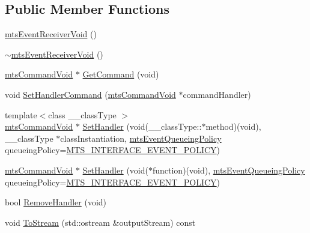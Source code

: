 \subsection*{Public Member Functions}
\begin{DoxyCompactItemize}
\item 
\hyperlink{classmts_event_receiver_void_a211c3ee9432981545d688bf092554813}{mts\+Event\+Receiver\+Void} ()
\item 
\hyperlink{classmts_event_receiver_void_a7c910721b7b8ae3a6b20ba2942da84b8}{$\sim$mts\+Event\+Receiver\+Void} ()
\item 
\hyperlink{classmts_command_void}{mts\+Command\+Void} $\ast$ \hyperlink{classmts_event_receiver_void_aad0d7c5fa7319e95aa7d645b6c5f780d}{Get\+Command} (void)
\item 
void \hyperlink{classmts_event_receiver_void_a43fc8ec1b8ea69fc7cf63d08405114cf}{Set\+Handler\+Command} (\hyperlink{classmts_command_void}{mts\+Command\+Void} $\ast$command\+Handler)
\item 
{\footnotesize template$<$class \+\_\+\+\_\+class\+Type $>$ }\\\hyperlink{classmts_command_void}{mts\+Command\+Void} $\ast$ \hyperlink{classmts_event_receiver_void_afe4089691c2e13f94b76f595976552fb}{Set\+Handler} (void(\+\_\+\+\_\+class\+Type\+::$\ast$method)(void), \+\_\+\+\_\+class\+Type $\ast$class\+Instantiation, \hyperlink{mts_forward_declarations_8h_a9286ac2ca46e5bcd57059550faa96916}{mts\+Event\+Queueing\+Policy} queueing\+Policy=\hyperlink{mts_forward_declarations_8h_a9286ac2ca46e5bcd57059550faa96916a3d4338e85690d50e9ab167be77cdefa0}{M\+T\+S\+\_\+\+I\+N\+T\+E\+R\+F\+A\+C\+E\+\_\+\+E\+V\+E\+N\+T\+\_\+\+P\+O\+L\+I\+C\+Y})
\item 
\hyperlink{classmts_command_void}{mts\+Command\+Void} $\ast$ \hyperlink{classmts_event_receiver_void_ae9253b2d2902daced62c41a9229cf239}{Set\+Handler} (void($\ast$function)(void), \hyperlink{mts_forward_declarations_8h_a9286ac2ca46e5bcd57059550faa96916}{mts\+Event\+Queueing\+Policy} queueing\+Policy=\hyperlink{mts_forward_declarations_8h_a9286ac2ca46e5bcd57059550faa96916a3d4338e85690d50e9ab167be77cdefa0}{M\+T\+S\+\_\+\+I\+N\+T\+E\+R\+F\+A\+C\+E\+\_\+\+E\+V\+E\+N\+T\+\_\+\+P\+O\+L\+I\+C\+Y})
\item 
bool \hyperlink{classmts_event_receiver_void_ae67c66dda217223f31e605f861029f74}{Remove\+Handler} (void)
\item 
void \hyperlink{classmts_event_receiver_void_a81b10b35b461cd995f6cf8e15fd1e1f1}{To\+Stream} (std\+::ostream \&output\+Stream) const 
\end{DoxyCompactItemize}
